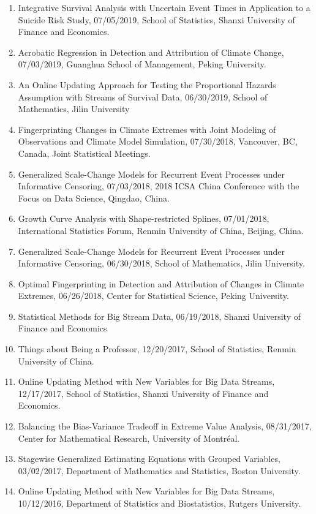 \documentclass[Statistics]{vita}
\begin{document}
\begin{vita}
\begin{enumerate}
  \item Integrative Survival Analysis with Uncertain Event Times in Application to a Suicide Risk Study, 07/05/2019, School of Statistics, Shanxi University of Finance and Economics.
  \item Acrobatic Regression in Detection and Attribution of Climate Change, 07/03/2019, Guanghua School of Management, Peking University.
  \item An Online Updating Approach for Testing the Proportional Hazards Assumption with Streams of Survival Data, 06/30/2019, School of Mathematics, Jilin University
  \item Fingerprinting Changes in Climate Extremes with Joint Modeling of Observations and Climate Model Simulation, 07/30/2018, Vancouver, BC, Canada, Joint Statistical Meetings.
  \item Generalized Scale-Change Models for Recurrent Event Processes under Informative Censoring, 07/03/2018, 2018 ICSA China Conference with the Focus on Data Science, Qingdao, China.
  \item Growth Curve Analysis with Shape-restricted Splines, 07/01/2018, International Statistics Forum, Renmin University of China, Beijing, China.
  \item Generalized Scale-Change Models for Recurrent Event Processes under Informative Censoring, 06/30/2018, School of Mathematics, Jilin University.
  \item Optimal Fingerprinting in Detection and Attribution of Changes in Climate Extremes, 06/26/2018, Center for Statistical Science, Peking University.
  \item Statistical Methods for Big Stream Data, 06/19/2018, Shanxi University of Finance and Economics
  \item Things about Being a Professor, 12/20/2017, School of Statistics, Renmin University of China.
  \item Online Updating Method with New Variables for Big Data Streams, 12/17/2017, School of Statistics, Shanxi University of Finance and Economics.
  \item Balancing the Bias-Variance Tradeoff in Extreme Value Analysis, 08/31/2017, Center for Mathematical Research, University of Montr\'eal.
  \item Stagewise Generalized Estimating Equations with Grouped Variables, 03/02/2017, Department of Mathematics and Statistics, Boston University.
  \item Online Updating Method with New Variables for Big Data Streams, 10/12/2016, Department of Statistics and Biostatistics, Rutgers University.

\end{enumerate}
\end{vita}
\end{document}
